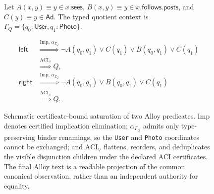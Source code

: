 \begin{figure}[t]
\vspace{4pt}

\begin{minipage}{0.95\linewidth}
Let
\(A(x,y)\equiv y\in x.\mathsf{sees}\),
\(B(x,y)\equiv y\in x.\mathsf{follows}.\mathsf{posts}\), and
\(C(y)\equiv y\in\mathsf{Ad}\).
The typed quotient context is
\(\Gamma_Q=\{q_0:\mathsf{User},q_1:\mathsf{Photo}\}\).

\[
\begin{aligned}
\mathsf{left}
&\stackrel{\mathrm{Imp},\,\alpha_{\Gamma_Q}}{\Longrightarrow}
  \neg A(q_0,q_1)\lor C(q_1)\lor B(q_0,q_1)\lor C(q_1)\\
&\stackrel{\mathrm{ACI}_{\lor}}{\Longrightarrow} Q,
\\[1mm]
\mathsf{right}
&\stackrel{\mathrm{Imp},\,\alpha_{\Gamma_Q}}{\Longrightarrow}
  \neg A(q_0,q_1)\lor B(q_0,q_1)\lor C(q_1)\\
&\stackrel{\mathrm{ACI}_{\lor}}{\Longrightarrow} Q.
\end{aligned}
\]
\end{minipage}

\vspace{2pt}


\caption{Schematic certificate-bound saturation of two Alloy
predicates. $\mathrm{Imp}$ denotes certified implication elimination;
$\alpha_{\Gamma_Q}$ admits only type-preserving binder renamings, so
the \texttt{User} and \texttt{Photo} coordinates cannot be exchanged;
and $\mathrm{ACI}_{\lor}$ flattens, reorders, and deduplicates the
visible disjunction children under the declared ACI certificates.
The final Alloy text is a readable projection of the common canonical
observation, rather than an independent authority for equality.}
\label{fig:alloy-certificate-example}
\end{figure}